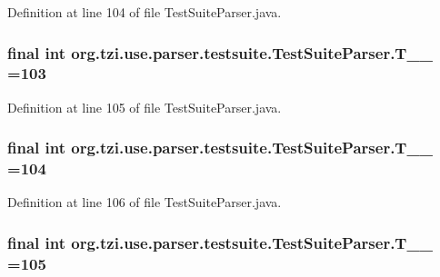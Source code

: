 Definition at line 104 of file Test\-Suite\-Parser.\-java.

\hypertarget{classorg_1_1tzi_1_1use_1_1parser_1_1testsuite_1_1_test_suite_parser_a15e8c40f3af63dfef24aafec9ccd1ef8}{
\subsubsection[{T\-\_\-\-\_\-103}]{\setlength{\rightskip}{0pt plus 5cm}final int org.\-tzi.\-use.\-parser.\-testsuite.\-Test\-Suite\-Parser.\-T\-\_\-\-\_ =103\hspace{0.3cm}{\ttfamily [static]}}}\label{classorg_1_1tzi_1_1use_1_1parser_1_1testsuite_1_1_test_suite_parser_a15e8c40f3af63dfef24aafec9ccd1ef8}


Definition at line 105 of file Test\-Suite\-Parser.\-java.

\hypertarget{classorg_1_1tzi_1_1use_1_1parser_1_1testsuite_1_1_test_suite_parser_a24281625343361af122215d217582e35}{
\subsubsection[{T\-\_\-\-\_\-104}]{\setlength{\rightskip}{0pt plus 5cm}final int org.\-tzi.\-use.\-parser.\-testsuite.\-Test\-Suite\-Parser.\-T\-\_\-\-\_ =104\hspace{0.3cm}{\ttfamily [static]}}}\label{classorg_1_1tzi_1_1use_1_1parser_1_1testsuite_1_1_test_suite_parser_a24281625343361af122215d217582e35}


Definition at line 106 of file Test\-Suite\-Parser.\-java.

\hypertarget{classorg_1_1tzi_1_1use_1_1parser_1_1testsuite_1_1_test_suite_parser_a484891e6712267c0730eace0ac9d7f54}{
\subsubsection[{T\-\_\-\-\_\-105}]{\setlength{\rightskip}{0pt plus 5cm}final int org.\-tzi.\-use.\-parser.\-testsuite.\-Test\-Suite\-Parser.\-T\-\_\-\-\_ =105\hspace{0.3cm}{\ttfamily [static]}}}\label{classorg_1_1tzi_1_1use_1_1parser_1_1testsuite_1_1_test_suite_parser_a484891e6712267c0730eace0ac9d7f54}


